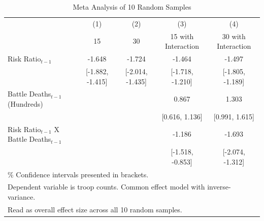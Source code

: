 \documentclass{beamer}
\begin{document}
\begin{frame}[fragile]

\begin{table}[htbp]\centering
\fontsize{5.5}{6}\selectfont
\def\sym#1{\ifmmode^{#1}\else\(^{#1}\)\fi}
\caption{Meta Analysis of 10 Random Samples \label{Table 10}}
\vspace{0.4cm}
\begin{tabular}{l*{4}{c}}
\hline\hline
        &\multicolumn{1}{c}{(1)}     &\multicolumn{1}{c}{(2)}  & \multicolumn{1}{c}{(3)}  & \multicolumn{1}{c}{(4)}      \\
        &          15                &          30             & 15 with Interaction      & 30 with Interaction         \\
\hline
Risk Ratio$_{t-1}$ &   -1.648        &      -1.724        &    -1.464           &   -1.497   \\
                 &  [-1.882, -1.415]  &   [-2.014, -1.435] &  [-1.718, -1.210]   &  [-1.805, -1.189]  \\
[0.25em]
Battle Deaths$_{t-1}$ (Hundreds)  &         &             &     0.867           &  1.303  \\
        &                           &                     &  [0.616, 1.136]     & [0.991, 1.615] \\
[0.25em]
Risk Ratio$_{t-1}$ X Battle Deaths$_{t-1}$  &   &         &   -1.186            &   -1.693 \\
                    &               &                     &   [-1.518, -0.853]  &   [-2.074, -1.312] \\ 
\hline\hline
\multicolumn{5}{l}{\fontsize{5.5}{6}\selectfont 95\% Confidence intervals presented in brackets.}\\
\multicolumn{5}{l}{\fontsize{5.5}{6}\selectfont Dependent variable is troop counts. Common effect model with inverse-variance.}\\
\multicolumn{5}{l}{\fontsize{5.5}{6}\selectfont Read as overall effect size across all 10 random samples.}\\
\end{tabular}
\end{table}

\end{frame}



\end{document}
